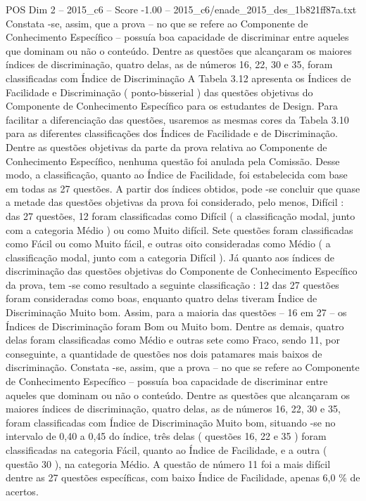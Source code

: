 \begin{textsample}{POS Dim 2 – 2015\_c6 – Score -1.00 – 2015\_c6/enade\_2015\_des\_1b821ff87a.txt}
Constata -se, assim, que a prova – no que se refere ao Componente de Conhecimento Específico – possuía boa capacidade de discriminar entre aqueles que dominam ou não o conteúdo.
Dentre as questões que alcançaram os maiores índices de discriminação, quatro delas, as de números 16, 22, 30 e 35, foram classificadas com Índice de Discriminação A Tabela 3.12 apresenta os Índices de Facilidade e Discriminação ( ponto-bisserial ) das questões objetivas do Componente de Conhecimento Específico para os estudantes de Design.
Para facilitar a diferenciação das questões, usaremos as mesmas cores da Tabela 3.10 para as diferentes classificações dos Índices de Facilidade e de Discriminação.
Dentre as questões objetivas da parte da prova relativa ao Componente de Conhecimento Específico, nenhuma questão foi anulada pela Comissão.
Desse modo, a classificação, quanto ao Índice de Facilidade, foi estabelecida com base em todas as 27 questões.
A partir dos índices obtidos, pode -se concluir que quase a metade das questões objetivas da prova foi considerado, pelo menos, Difícil : das 27 questões, 12 foram classificadas como Difícil ( a classificação modal, junto com a categoria Médio ) ou como Muito difícil.
Sete questões foram classificadas como Fácil ou como Muito fácil, e outras oito consideradas como Médio ( a classificação modal, junto com a categoria Difícil ).
Já quanto aos índices de discriminação das questões objetivas do Componente de Conhecimento Específico da prova, tem -se como resultado a seguinte classificação : 12 das 27 questões foram consideradas como boas, enquanto quatro delas tiveram Índice de Discriminação Muito bom.
Assim, para a maioria das questões – 16 em 27 – os Índices de Discriminação foram Bom ou Muito bom.
Dentre as demais, quatro delas foram classificadas como Médio e outras sete como Fraco, sendo 11, por conseguinte, a quantidade de questões nos dois patamares mais baixos de discriminação.
Constata -se, assim, que a prova – no que se refere ao Componente de Conhecimento Específico – possuía boa capacidade de discriminar entre aqueles que dominam ou não o conteúdo.
Dentre as questões que alcançaram os maiores índices de discriminação, quatro delas, as de números 16, 22, 30 e 35, foram classificadas com Índice de Discriminação Muito bom, situando -se no intervalo de 0,40 a 0,45 do índice, três delas ( questões 16, 22 e 35 ) foram classificadas na categoria Fácil, quanto ao Índice de Facilidade, e a outra ( questão 30 ), na categoria Médio.
A questão de número 11 foi a mais difícil dentre as 27 questões específicas, com baixo Índice de Facilidade, apenas 6,0 \% de acertos.

\end{textsample}

